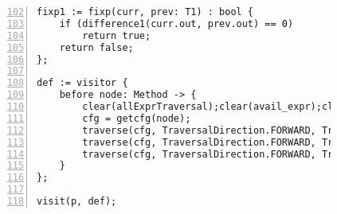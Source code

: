 \begin{figure}[ht!]
\begin{lstlisting}[numbers=left, tabsize=4, escapechar=@, caption={Available expression analysis},label={lst:ae-code},firstline=102, firstnumber=102]
fixp1 := fixp(curr, prev: T1) : bool {
	if (difference1(curr.out, prev.out) == 0)
		return true;	
	return false;
};

def := visitor {
	before node: Method -> {
		clear(allExprTraversal);clear(avail_expr);clear(killTraversal);clear(allExprset);
		cfg = getcfg(node);
		traverse(cfg, TraversalDirection.FORWARD, TraversalKind.HYBRID, allExprTraversal);
		traverse(cfg, TraversalDirection.FORWARD, TraversalKind.HYBRID, killTraversal);
		traverse(cfg, TraversalDirection.FORWARD, TraversalKind.HYBRID, avail_expr, fixp1);		
	}
};

visit(p, def);
\end{lstlisting}
\end{figure}